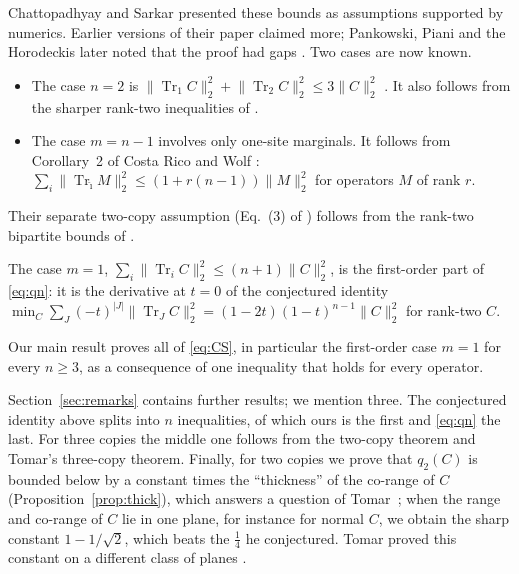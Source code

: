 \documentclass[11pt]{article}
\theoremstyle{remark}
\newcommand{\Tr}{\operatorname{Tr}}
\newcommand{\norm}[1]{\lVert #1\rVert}
\begin{document}
Chattopadhyay and Sarkar presented these bounds as assumptions supported by numerics. Earlier versions of their paper
claimed more; Pankowski, Piani and the Horodeckis later noted that the proof had gaps \cite{PPHH}. Two cases are now
known.
\begin{itemize}
\item The case $n=2$ is $\norm{\Tr_1C}_2^2+\norm{\Tr_2C}_2^2\le3\norm{C}_2^2$ \cite[Eq.~(32)]{CRW}. It also follows from
the sharper rank-two inequalities of \cite{FHPV,BGH}.
\item The case $m=n-1$ involves only one-site marginals. It follows from Corollary~2 of Costa Rico and Wolf \cite{CRW}:
$\sum_i\norm{\Tr_{\hat\imath}M}_2^2\le(1+r(n-1))\norm{M}_2^2$ for operators $M$ of rank $r$.
\end{itemize}
Their separate two-copy assumption (Eq.~(3) of \cite{CS}) follows from the rank-two bipartite bounds of
\cite{FHPV,BGH}.

The case $m=1$, $\sum_i\norm{\Tr_iC}_2^2\le(n+1)\norm{C}_2^2$, is the first-order part of \eqref{eq:qn}: it is the
derivative at $t=0$ of the conjectured identity
$\min_C\sum_J(-t)^{|J|}\norm{\Tr_JC}_2^2=(1-2t)(1-t)^{n-1}\norm{C}_2^2$ for rank-two $C$.

Our main result proves all of \eqref{eq:CS}, in particular the first-order case $m=1$ for every $n\ge3$, as a
consequence of one inequality that holds for every operator.

Section~\ref{sec:remarks} contains further results; we mention three. The conjectured identity above splits into $n$ inequalities,
of which ours is the first and \eqref{eq:qn} the last. For three copies the middle one follows from the two-copy
theorem and Tomar's three-copy theorem. Finally, for two copies we prove that $q_2(C)$ is bounded below by a constant
times the ``thickness'' of the co-range of $C$ (Proposition~\ref{prop:thick}), which answers a question of
Tomar~\cite{Tomar2}; when the range and co-range of $C$ lie in one plane, for instance for normal $C$, we obtain the
sharp constant $1-1/\sqrt2$, which beats the $\frac14$ he conjectured. Tomar proved this constant on a different class
of planes \cite[Thm.~7.2]{Tomar2}.
\end{document}
